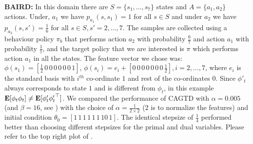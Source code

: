 \textbf{BAIRD:} In this domain there are $S=\{s_1,\ldots,s_7\}$ states and $A=\{a_1,a_2\}$ actions. Under, $a_1$ we have $p_{a_1}(s,s_1)=1$ for all $s\in S$ and under $a_2$ we have $p_{a_2}(s,s')=\frac{1}{6}$ for all $s\in S, s'=2,\ldots,7$. The samples are collected using a behaviour policy $\pi_b$ that performs action $a_2$ with probability $\frac{6}{7}$ and action $a_1$ with probability $\frac17$, and the target policy that we are interested is $\pi$ which performs action $a_1$ in all the states. The feature vector we chose was: $\phi(s_1)=[\frac{1}{2}\,0\,0\,0\,0\,0\,0\,1]$, $\phi(s_i)=e_i+[0\,0\,0\,0\,0\,0\,0\,\frac{1}{2}], i=2,\ldots,7$, where $e_i$ is the standard basis with $i^{th}$ co-ordinate $1$ and rest of the co-ordinates $0$. Since $\phi'_t$ always corresponds to state $1$ and is different from $\phi_t$, in this example $\mathbf{E}[{\phi_t\phi_t}]\neq\mathbf{E}[{\phi'_t{\phi'_t}^\top}]$.
We compared the performance of CAGTD with $\alpha=0.005$ (and $\beta=16$, see \cite{gtdmp}) with the choice of $\alpha=\frac{1}{2\times 2}$ ($2$ is to normalize the features) and initial condition $\theta_0=[1\, 1\, 1\, 1\, 1\, 1\, 10\, 1]$. The identical stepsize of $\frac{1}{4}$ performed better than choosing different stepsizes for the primal and dual variables. Please refer to the top right plot of . 

